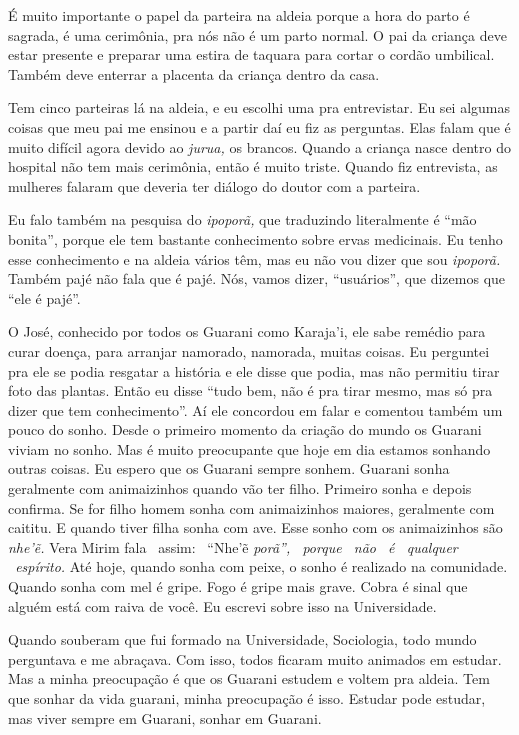É muito importante o papel da parteira na aldeia porque a hora do parto
é sagrada, é uma cerimônia, pra nós não é um parto normal. O pai da
criança deve estar presente e preparar uma estira de taquara para cortar
o cordão umbilical. Também deve enterrar a placenta da criança dentro da
casa.

Tem cinco parteiras lá na aldeia, e eu escolhi uma pra entrevistar. Eu
sei algumas coisas que meu pai me ensinou e a partir daí eu fiz as
perguntas. Elas falam que é muito difícil agora devido ao \emph{jurua,}
os brancos. Quando a criança nasce dentro do hospital não tem mais
cerimônia, então é muito triste. Quando fiz entrevista, as mulheres
falaram que deveria ter diálogo do doutor com a parteira.

Eu falo também na pesquisa do \emph{ipoporã,} que traduzindo
literalmente é ``mão bonita'', porque ele tem bastante conhecimento
sobre ervas medicinais. Eu tenho esse conhecimento e na aldeia vários
têm, mas eu não vou dizer que sou \emph{ipoporã.} Também pajé não fala
que é pajé. Nós, vamos dizer, ``usuários'', que dizemos que ``ele é
pajé''.

O José, conhecido por todos os Guarani como Karaja'i, ele sabe remédio
para curar doença, para arranjar namorado, namorada, muitas coisas. Eu
perguntei pra ele se podia resgatar a história e ele disse que podia,
mas não permitiu tirar foto das plantas. Então eu disse ``tudo bem, não
é pra tirar mesmo, mas só pra dizer que tem conhecimento''. Aí ele
concordou em falar e comentou também um pouco do sonho. Desde o primeiro
momento da criação do mundo os Guarani viviam no sonho. Mas é muito
preocupante que hoje em dia estamos sonhando outras coisas. Eu espero
que os Guarani sempre sonhem. Guarani sonha geralmente com animaizinhos
quando vão ter filho. Primeiro sonha e depois confirma. Se for filho
homem sonha com animaizinhos maiores, geralmente com caititu. E quando
tiver filha sonha com ave. Esse sonho com os animaizinhos são
\emph{nhe'ẽ.} Vera Mirim fala ~assim: ~``Nhe'ẽ \emph{porã'', ~porque
~não ~é ~qualquer ~espírito.} Até hoje, quando sonha com peixe, o sonho
é realizado na comunidade. Quando sonha com mel é gripe. Fogo é gripe
mais grave. Cobra é sinal que alguém está com raiva de você. Eu escrevi
sobre isso na Universidade.

Quando souberam que fui formado na Universidade, Sociologia, todo mundo
perguntava e me abraçava. Com isso, todos ficaram muito animados em
estudar. Mas a minha preocupação é que os Guarani estudem e voltem pra
aldeia. Tem que sonhar da vida guarani, minha preocupação é isso.
Estudar pode estudar, mas viver sempre em Guarani, sonhar em Guarani.

